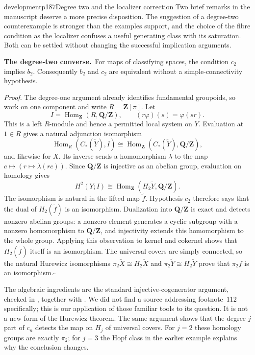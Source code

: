 \begin{dcomment}{development}{p187}{Degree two and the localizer correction}
Two brief remarks in the manuscript deserve a more precise disposition. The suggestion of a degree-two counterexample is stronger than the examples support, and the choice of the fibre condition as the localizer confuses a useful generating class with its saturation. Both can be settled without changing the successful implication arguments.

\textbf{The degree-two converse.}\ours\ For maps of classifying spaces, the condition $c_2$ implies $b_2$. Consequently $b_2$ and $c_2$ are equivalent without a simple-connectivity hypothesis.

\textit{Proof.} The degree-one argument already identifies fundamental groupoids, so work on one component and write $R=\mathbf Z[\pi]$. Let
\[
 I=\operatorname{Hom}_{\mathbf Z}(R,\mathbf Q/\mathbf Z),
 \qquad (r\varphi)(s)=\varphi(sr).
\]
This is a left $R$-module and hence a permitted local system on $Y$. Evaluation at $1\in R$ gives a natural adjunction isomorphism
\[
 \operatorname{Hom}_R(C_*(\widetilde Y),I)
 \cong\operatorname{Hom}_{\mathbf Z}
                  (C_*(\widetilde Y),\mathbf Q/\mathbf Z),
\]
and likewise for $X$. Its inverse sends a homomorphism $\lambda$ to the map $c\mapsto(r\mapsto\lambda(rc))$. Since $\mathbf Q/\mathbf Z$ is injective as an abelian group, evaluation on homology gives
\[
 H^2(Y;I)\cong
 \operatorname{Hom}_{\mathbf Z}(H_2\widetilde Y,\mathbf Q/\mathbf Z).
\]
The isomorphism is natural in the lifted map $\widetilde f$. Hypothesis $c_2$ therefore says that the dual of $H_2(\widetilde f)$ is an isomorphism. Dualization into $\mathbf Q/\mathbf Z$ is exact and detects nonzero abelian groups: a nonzero element generates a cyclic subgroup with a nonzero homomorphism to $\mathbf Q/\mathbf Z$, and injectivity extends this homomorphism to the whole group. Applying this observation to kernel and cokernel shows that $H_2(\widetilde f)$ itself is an isomorphism. The universal covers are simply connected, so the natural Hurewicz isomorphisms $\pi_2\widetilde X\cong H_2\widetilde X$ and $\pi_2\widetilde Y\cong H_2\widetilde Y$ prove that $\pi_2f$ is an isomorphism.\hfill$\square$

The algebraic ingredients are the standard injective-cogenerator argument, checked in \citet[Tags 01D8 and 08WE]{StacksInjective2026}, together with \citet[Theorem~4.32]{Hatcher2002}. We did not find a source addressing footnote~112 specifically; this is our application of those familiar tools to its question. It is not a new form of the Hurewicz theorem. The same argument shows that the degree-$j$ part of $c_n$ detects the map on $H_j$ of universal covers. For $j=2$ these homology groups are exactly $\pi_2$; for $j=3$ the Hopf class in the earlier example explains why the conclusion changes.


\end{dcomment}
